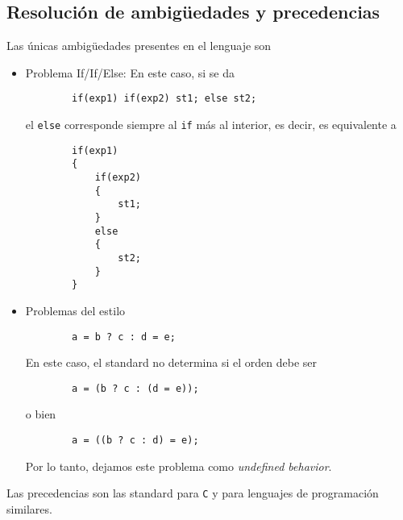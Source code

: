 \documentclass[12pt]{article}
\begin{document}
    \subsection*{Resoluci\'on de ambig\"uedades y precedencias}
    
    Las \'unicas ambig\"uedades presentes en el lenguaje son
    \begin{itemize}
        \item Problema If/If/Else: En este caso, si se da
        \begin{verbatim}
        if(exp1) if(exp2) st1; else st2;
        \end{verbatim}
        el \texttt{else} corresponde siempre al \texttt{if} m\'as al interior, es decir, es equivalente a
        \begin{verbatim}
        if(exp1)
        {
            if(exp2)
            {
                st1;
            }
            else
            {
                st2;
            }
        }
        \end{verbatim}
        \item Problemas del estilo
        \begin{verbatim}
        a = b ? c : d = e;
        \end{verbatim}
        En este caso, el standard no determina si el orden debe ser
        \begin{verbatim}
        a = (b ? c : (d = e));
        \end{verbatim}
        o bien
        \begin{verbatim}
        a = ((b ? c : d) = e);
        \end{verbatim}
        Por lo tanto, dejamos este problema como \textit{undefined behavior}.
    \end{itemize}
    
    Las precedencias son las standard para \texttt{C} y para lenguajes de programaci\'on similares.
    
\end{document}
